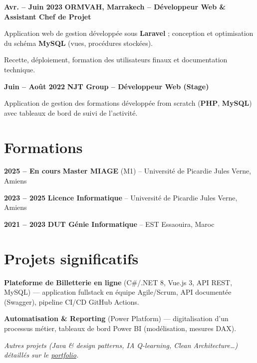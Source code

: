 \documentclass[10pt,a4paper]{article}
\newenvironment{resume_list}{\vspace{-2pt}\begin{itemize}[itemsep=0.3pt,parsep=0pt,topsep=0.3pt,leftmargin=18pt]}{\end{itemize}\vspace{-2pt}}
\newcommand{\heading}[2]{{\raggedright\noindent\textbf{#2} \quad \textbf{#1}\\}}
\begin{document}
\heading{ORMVAH, Marrakech \textbf{--} Développeur Web \& Assistant Chef de Projet}{Avr. -- Juin 2023}
\begin{resume_list}
  \item Application web de gestion développée sous \textbf{Laravel} ; conception et optimisation du schéma \textbf{MySQL} (vues, procédures stockées).
  \item Recette, déploiement, formation des utilisateurs finaux et documentation technique.
\end{resume_list}

\heading{NJT Group \textbf{--} Développeur Web (Stage)}{Juin -- Août 2022}
\begin{resume_list}
  \item Application de gestion des formations développée from scratch (\textbf{PHP}, \textbf{MySQL}) avec tableaux de bord de suivi de l'activité.
\end{resume_list}

\section{Formations}
\begin{resume_list}
  \item \textbf{2025 -- En cours} \quad \textbf{Master MIAGE} (M1) -- Université de Picardie Jules Verne, Amiens
  \item \textbf{2023 -- 2025} \quad \textbf{Licence Informatique} -- Université de Picardie Jules Verne, Amiens
  \item \textbf{2021 -- 2023} \quad \textbf{DUT Génie Informatique} -- EST Essaouira, Maroc
\end{resume_list}

\section{Projets significatifs}
\begin{resume_list}
  \item \textbf{Plateforme de Billetterie en ligne} (C\#/.NET 8, Vue.js 3, API REST, MySQL) --- application fullstack en équipe Agile/Scrum, API documentée (Swagger), pipeline CI/CD GitHub Actions.
  \item \textbf{Automatisation \& Reporting} (Power Platform) --- digitalisation d'un processus métier, tableaux de bord Power BI (modélisation, mesures DAX).
  \item \textit{Autres projets (Java \& design patterns, IA Q-learning, Clean Architecture…) détaillés sur le \href{https://oualidhmoudou.github.io}{\color{accentText}\underline{portfolio}}.}
\end{resume_list}
\end{document}
